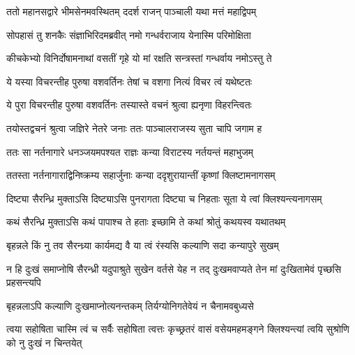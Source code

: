 \twolineshloka
{ततो महानसद्वारे भीमसेनमवस्थितम्}
{ददर्श राजन् पाञ्चाली यथा मत्तं महाद्विपम्}


\twolineshloka
{सोपहासं तु शनकैः संज्ञाभिरिदमब्रवीत्}
{नमो गन्धर्वराजाय येनास्मि परिमोक्षिता}


\twolineshloka
{कीचकेभ्यो विनिर्दोषामनाथां वसतीं गृहे}
{यो मां रक्षति सन्त्रस्तां गन्धर्वाय नमोऽस्तु ते}




\twolineshloka
{ये यस्या विचरन्तीह पुरुषा वशवर्तिनः}
{तेषां च वशगा नित्यं विचर त्वं यथेष्टतः}


\twolineshloka
{ये पुरा विचरन्तीह पुरुषा वशवर्तिनः}
{तस्यास्ते वचनं श्रुत्वा ह्यनृणा विहरन्त्वितः}



\twolineshloka
{तयोस्तद्वचनं श्रुत्वा जज्ञिरे नेतरे जनाः}
{ततः पाञ्चालराजस्य सुता चापि जगाम ह}


\twolineshloka
{ततः सा नर्तनागारे धनञ्जयमपश्यत}
{राज्ञः कन्या विराटस्य नर्तयन्तं महाभुजम्}


\twolineshloka
{ततस्ता नर्तनागाराद्विनिष्क्रम्य सहार्जुनाः}
{कन्या ददृशुरायान्तीं कृष्णां क्लिष्टामनागसम्}




\twolineshloka
{दिष्ट्या सैरन्ध्रि मुक्ताऽसि दिष्ट्याऽसि पुनरागता}
{दिष्ट्या च निहताः सूता ये त्वां क्लिश्यन्त्यनागसम्}




\twolineshloka
{कथं सैरन्ध्रि मुक्ताऽसि कथं पापाश्च ते हताः}
{इच्छामि ते कथां श्रोतुं कथयस्व यथातथम्}




\twolineshloka
{बृहन्नले किं नु तव सैरन्ध्र्या कार्यमद्य वै}
{या त्वं रंस्यसि कल्याणि सदा कन्यापुरे सुखम्}


\threelineshloka
{न हि दुःखं समाप्नोषि सैरन्ध्री यदुपाश्रुते}
{सुखेन वर्तसे येह न तद् दुःखमवाप्यते}
{तेन मां दुःखितामेवं पृच्छसि प्रहसन्त्यपि}




\twolineshloka
{बृहन्नलाऽपि कल्याणि दुःखमाप्नोत्यनन्तकम्}
{तिर्यग्योनिगतेवेयं न चैनामवबुध्यसे}


\threelineshloka
{त्वया सहोषिता चास्मि त्वं च सर्वैः सहोषिता}
{त्वत्तः कृच्छ्रतरं वासं वसेयमहमङ्गने}
{क्लिश्यन्त्यां त्वयि सुश्रोणि को नु दुःखं न चिन्तयेत्}


